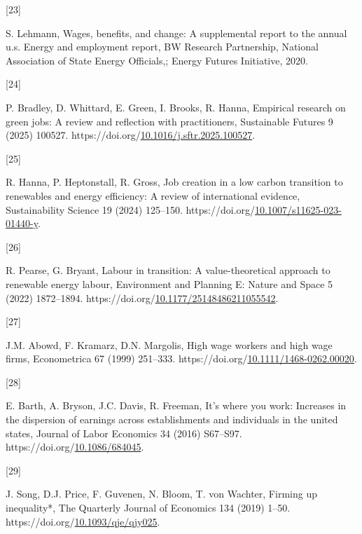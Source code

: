 \documentclass[
  11pt,
]{article}
\newlength{\cslhangindent}
\newlength{\csllabelwidth}
\newenvironment{CSLReferences}[2] %
 {\begin{list}{}{%
  \setlength{\itemindent}{0pt}
  \setlength{\leftmargin}{0pt}
  \setlength{\parsep}{0pt}
  \ifodd #1
   \setlength{\leftmargin}{\cslhangindent}
   \setlength{\itemindent}{-1\cslhangindent}
  \fi
  \setlength{\itemsep}{#2\baselineskip}}}
 {\end{list}}
\newcommand{\CSLLeftMargin}[1]{\parbox[t]{\csllabelwidth}{\strut#1\strut}}
\newcommand{\CSLRightInline}[1]{\parbox[t]{\linewidth - \csllabelwidth}{\strut#1\strut}}
\begin{document}
\begin{CSLReferences}{0}{0}
\CSLLeftMargin{{[}23{]} }%
\CSLRightInline{S. Lehmann, Wages, benefits, and change: A supplemental
report to the annual u.s. Energy and employment report, BW Research
Partnership, National Association of State Energy Officials,; Energy
Futures Initiative, 2020.}

\CSLLeftMargin{{[}24{]} }%
\CSLRightInline{P. Bradley, D. Whittard, E. Green, I. Brooks, R. Hanna,
Empirical research on green jobs: A review and reflection with
practitioners, Sustainable Futures 9 (2025) 100527.
https://doi.org/\href{https://doi.org/10.1016/j.sftr.2025.100527}{10.1016/j.sftr.2025.100527}.}

\CSLLeftMargin{{[}25{]} }%
\CSLRightInline{R. Hanna, P. Heptonstall, R. Gross, Job creation in a
low carbon transition to renewables and energy efficiency: A review of
international evidence, Sustainability Science 19 (2024) 125--150.
https://doi.org/\href{https://doi.org/10.1007/s11625-023-01440-y}{10.1007/s11625-023-01440-y}.}

\CSLLeftMargin{{[}26{]} }%
\CSLRightInline{R. Pearse, G. Bryant, Labour in transition: A
value-theoretical approach to renewable energy labour, Environment and
Planning E: Nature and Space 5 (2022) 1872--1894.
https://doi.org/\href{https://doi.org/10.1177/25148486211055542}{10.1177/25148486211055542}.}

\CSLLeftMargin{{[}27{]} }%
\CSLRightInline{J.M. Abowd, F. Kramarz, D.N. Margolis, High wage workers
and high wage firms, Econometrica 67 (1999) 251--333.
https://doi.org/\href{https://doi.org/10.1111/1468-0262.00020}{10.1111/1468-0262.00020}.}

\CSLLeftMargin{{[}28{]} }%
\CSLRightInline{E. Barth, A. Bryson, J.C. Davis, R. Freeman, It's where
you work: Increases in the dispersion of earnings across establishments
and individuals in the united states, Journal of Labor Economics 34
(2016) S67--S97.
https://doi.org/\href{https://doi.org/10.1086/684045}{10.1086/684045}.}

\CSLLeftMargin{{[}29{]} }%
\CSLRightInline{J. Song, D.J. Price, F. Guvenen, N. Bloom, T. von
Wachter, Firming up inequality*, The Quarterly Journal of Economics 134
(2019) 1--50.
https://doi.org/\href{https://doi.org/10.1093/qje/qjy025}{10.1093/qje/qjy025}.}


\end{CSLReferences}
\end{document}
